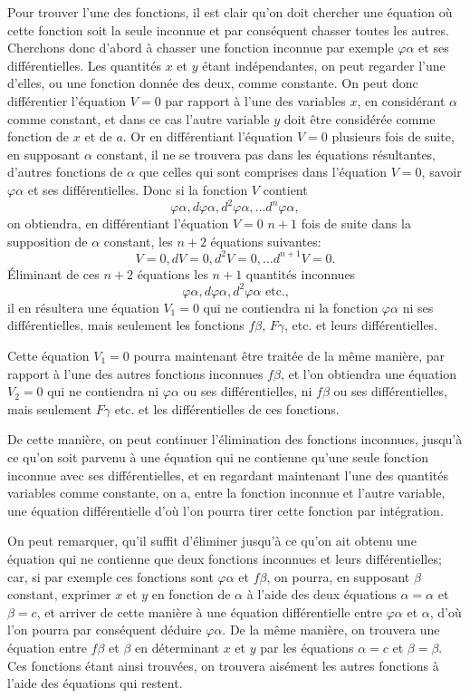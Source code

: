 \documentclass[oneside, 12 pt, leqno]{memoir}
\begin{document}
Pour trouver l'une des fonctions, il est clair qu'on doit chercher une équation où cette fonction soit la seule inconnue et par conséquent chasser toutes les autres. Cherchons donc d'abord à chasser une fonction inconnue par exemple \(\varphi \alpha\) et ses différentielles. Les quantités \(x\) et \(y\) étant indépendantes, on peut regarder l'une d'elles, ou une fonction donnée des deux, comme constante. On peut donc différentier l'équation \(V=0\) par rapport à l'une des variables \(x\), en considérant \(\alpha\) comme constant, et dans ce cas l'autre variable \(y\) doit être considérée comme fonction de \(x\) et de \(a\). Or en différentiant l'équation \(V=0\) plusieurs fois de suite, en supposant \(\alpha\) constant, il ne se trouvera pas dans les équations résultantes, d'autres fonctions de \(\alpha\) que celles qui sont comprises dans l'équation \(V=0\), savoir \(\varphi \alpha\) et ses différentielles. Donc si la fonction \(V\) contient 
\[\varphi \alpha, d \varphi \alpha, d^2 \varphi \alpha, \ldots d^n \varphi \alpha,\]\clearpage\noindent%
on obtiendra, en différentiant l'équation \(V=0\) \(n+1\) fois de suite dans la supposition de \(\alpha\) constant, les \(n+2\) équations suivantes:
\[V=0, d V=0, d^2 V=0, \ldots d^{n+1} V=0.\]
Éliminant de ces \(n+2\) équations les \(n+1\) quantités inconnues
\[\varphi \alpha, d \varphi \alpha, d^{2} \varphi \alpha \text{ etc.,}\]
il en résultera une équation \(V_1=0\) qui ne contiendra ni la fonction \(\varphi \alpha\) ni ses différentielles, mais seulement les fonctions \(f \beta\), \(F \gamma\), etc. et leurs différentielles.

Cette équation \(V_{1}=0\) pourra maintenant être traitée de la même manière, par rapport à l'une des autres fonctions inconnues \(f \beta\), et l'on obtiendra une équation \(V_2=0\) qui ne contiendra ni \(\varphi \alpha\) ou ses différentielles, ni \(f \beta\) ou ses différentielles, mais seulement \(F \gamma\) etc. et les différentielles de ces fonctions.

De cette manière, on peut continuer l'élimination des fonctions inconnues, jusqu'à ce qu'on soit parvenu à une équation qui ne contienne qu'une seule fonction inconnue avec ses différentielles, et en regardant maintenant l'une des quantités variables comme constante, on a, entre la fonction inconnue et l'autre variable, une équation différentielle d'où l'on pourra tirer cette fonction par intégration.

On peut remarquer, qu'il suffit d'éliminer jusqu'à ce qu'on ait obtenu une équation qui ne contienne que deux fonctions inconnues et leurs différentielles; car, si par exemple ces fonctions sont \(\varphi \alpha\) et \(f \beta\), on pourra, en supposant \(\beta\) constant, exprimer \(x\) et \(y\) en fonction de \(\alpha\) à l'aide des deux équations \(\alpha=\alpha\) et \(\beta=c\), et arriver de cette manière à une équation différentielle entre \(\varphi \alpha\) et \(\alpha\), d'où l'on pourra par conséquent déduire \(\varphi \alpha\). De la même manière, on trouvera une équation entre \(f \beta\) et \(\beta\) en déterminant \(x\) et \(y\) par les équations \(\alpha=c\) et \(\beta=\beta\). Ces fonctions étant ainsi trouvées, on trouvera aisément les autres fonctions à l'aide des équations qui restent.
\end{document}
